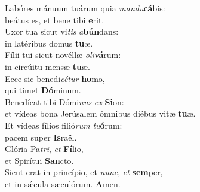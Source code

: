 \evenverse Labóres mánuum tuárum quia \textit{man}\textit{du}\textbf{cá}bis:~\*\\
\evenverse beátus es, et bene tibi \textbf{e}rit.\\
\oddverse Uxor tua sicut vi\textit{tis} \textit{a}\textbf{bún}dans:~\*\\
\oddverse in latéribus domus \textbf{tu}æ.\\
\evenverse Fílii tui sicut novéllæ \textit{o}\textit{li}\textbf{vá}rum:~\*\\
\evenverse in circúitu mensæ \textbf{tu}æ.\\
\oddverse Ecce sic benedi\textit{cé}\textit{tur} \textbf{ho}mo,~\*\\
\oddverse qui timet \textbf{Dó}minum.\\
\evenverse Benedícat tibi Dómi\textit{nus} \textit{ex} \textbf{Si}on:~\*\\
\evenverse et vídeas bona Jerúsalem ómnibus diébus vitæ \textbf{tu}æ.\\
\oddverse Et vídeas fílios filió\textit{rum} \textit{tu}\textbf{ó}rum:~\*\\
\oddverse pacem super \textbf{Is}raël.\\
\evenverse Glória Pa\textit{tri}, \textit{et} \textbf{Fí}lio,~\*\\
\evenverse et Spirítui \textbf{San}cto.\\
\oddverse Sicut erat in princípio, et \textit{nunc}, \textit{et} \textbf{sem}per,~\*\\
\oddverse et in sǽcula sæculórum. \textbf{A}men.\\
